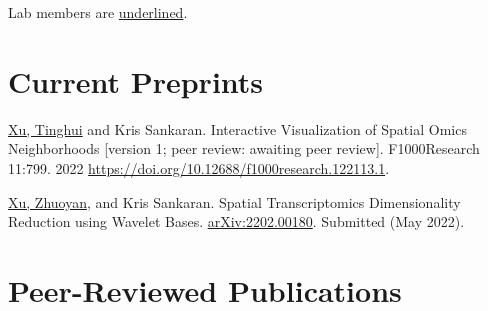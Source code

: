 \documentclass[letterpaper]{article}
\renewenvironment{itemize}{
  \begin{list}{}{
    \setlength{\leftmargin}{1.5em}
  }
}{
  \end{list}
}
\begin{document}
\pagebreak
Lab members are \underline{underlined}.
\section*{Current Preprints}

\begin{itemize}
\item \underline{Xu, Tinghui} and Kris Sankaran. Interactive Visualization of
Spatial Omics Neighborhoods [version 1; peer review: awaiting peer review]. F1000Research 11:799. 2022
\href{https://doi.org/10.12688/f1000research.122113.1}{https://doi.org/10.12688/f1000research.122113.1}.
\item \underline{Xu, Zhuoyan}, and Kris Sankaran. Spatial Transcriptomics
Dimensionality Reduction using Wavelet Bases. \href{https://arxiv.org/abs/2202.00180}{arXiv:2202.00180}.
Submitted (May 2022).
\end{itemize}
\section*{Peer-Reviewed Publications}
\end{document}
